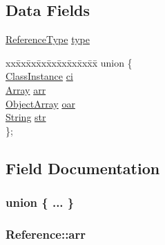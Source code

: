 \subsection*{Data Fields}
\begin{DoxyCompactItemize}
\item 
\hyperlink{jvm_8h_aa298d9663bceef9c2ac2880c5bae3327}{Reference\+Type} \hyperlink{structReference_a411b420a60aa7e3ac2c0d46351dc9f13}{type}
\item 
\begin{tabbing}
xx\=xx\=xx\=xx\=xx\=xx\=xx\=xx\=xx\=\kill
union \{\\
\>\hyperlink{structClassInstance}{ClassInstance} \hyperlink{structReference_add84ffa45a635db324cfcbe73ce7074c}{ci}\\
\>\hyperlink{structArray}{Array} \hyperlink{structReference_abc67939f75b19f2e4fc35ef13ee5c407}{arr}\\
\>\hyperlink{structObjectArray}{ObjectArray} \hyperlink{structReference_a5eac3f1de74138347244ca0ef623ee24}{oar}\\
\>\hyperlink{structString}{String} \hyperlink{structReference_a64f6150b1edb24e6a4bfa5c256539d3c}{str}\\
\}; \\

\end{tabbing}\end{DoxyCompactItemize}


\subsection{Field Documentation}
\subsubsection[{\texorpdfstring{"@14}{@14}}]{\setlength{\rightskip}{0pt plus 5cm}union \{ ... \} }\hypertarget{structReference_a8b3d086534ba791fd5485da1a32205aa}{}\label{structReference_a8b3d086534ba791fd5485da1a32205aa}
\subsubsection[{\texorpdfstring{arr}{arr}}]{ Reference\+::arr}\hypertarget{structReference_abc67939f75b19f2e4fc35ef13ee5c407}{}\label{structReference_abc67939f75b19f2e4fc35ef13ee5c407}
